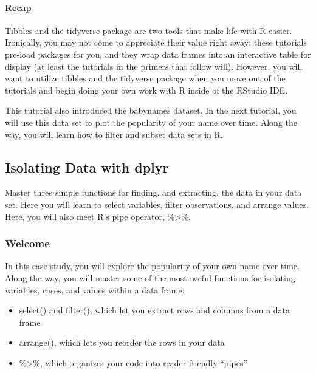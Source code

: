\documentclass[
]{article}
\providecommand{\tightlist}{%
  \setlength{\itemsep}{0pt}\setlength{\parskip}{0pt}}
\begin{document}
\hypertarget{recap-1}{%
\paragraph{Recap}\label{recap-1}}

Tibbles and the tidyverse package are two tools that make life with R
easier. Ironically, you may not come to appreciate their value right
away: these tutorials pre-load packages for you, and they wrap data
frames into an interactive table for display (at least the tutorials in
the primers that follow will). However, you will want to utilize tibbles
and the tidyverse package when you move out of the tutorials and begin
doing your own work with R inside of the RStudio IDE.

This tutorial also introduced the babynames dataset. In the next
tutorial, you will use this data set to plot the popularity of your name
over time. Along the way, you will learn how to filter and subset data
sets in R.

\hypertarget{isolating-data-with-dplyr}{%
\subsection{Isolating Data with dplyr}\label{isolating-data-with-dplyr}}

Master three simple functions for finding, and extracting, the data in
your data set. Here you will learn to select variables, filter
observations, and arrange values. Here, you will also meet R's pipe
operator, \%\textgreater\%.

\hypertarget{welcome-3}{%
\subsubsection{Welcome}\label{welcome-3}}

In this case study, you will explore the popularity of your own name
over time. Along the way, you will master some of the most useful
functions for isolating variables, cases, and values within a data
frame:

\begin{itemize}
\tightlist
\item
  select() and filter(), which let you extract rows and columns from a
  data frame
\item
  arrange(), which lets you reorder the rows in your data
\item
  \%\textgreater\%, which organizes your code into reader-friendly
  ``pipes''
\end{itemize}
\end{document}
